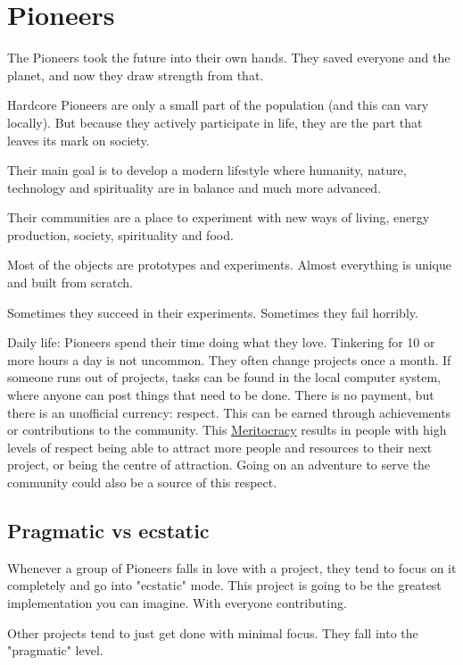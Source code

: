 \section{Pioneers}
\label{sec:Pioneers}

The Pioneers took the future into their own hands. They saved everyone and the planet, and now they draw strength from that.

Hardcore Pioneers are only a small part of the population (and this can vary locally). But because they actively participate in life, they are the part that leaves its mark on society.

Their main goal is to develop a modern lifestyle where humanity, nature, technology and spirituality are in balance and much more advanced.

Their communities are a place to experiment with new ways of living, energy production, society, spirituality and food.

Most of the objects are prototypes and experiments. Almost everything is unique and built from scratch.

Sometimes they succeed in their experiments. Sometimes they fail horribly.


Daily life: Pioneers spend their time doing what they love. Tinkering for 10 or more hours a day is not uncommon. They often change projects once a month. If someone runs out of projects, tasks can be found in the local computer system, where anyone can post things that need to be done. There is no payment, but there is an unofficial currency: respect. This can be earned through achievements or contributions to the community. This \hyperref[sec:meritocracy]{Meritocracy} results in people with high levels of respect being able to attract more people and resources to their next project, or being the centre of attraction.
Going on an adventure to serve the community could also be a source of this respect.

\subsection{Pragmatic vs ecstatic}

Whenever a group of Pioneers falls in love with a project, they tend to focus on it completely and go into "ecstatic" mode. This project is going to be the greatest implementation you can imagine. With everyone contributing.

Other projects tend to just get done with minimal focus. They fall into the "pragmatic" level.

